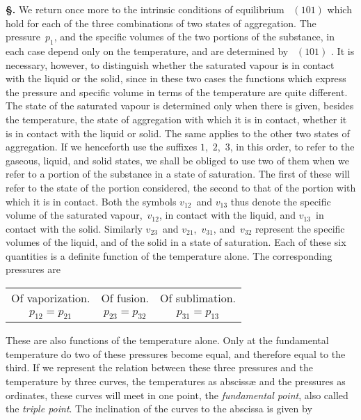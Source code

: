 \documentclass[12pt]{book}[2005/09/16]
\newcommand{\Chg}[2]{#2}
\newcommand{\Add}[1]{\Chg{}{#1}}
\newcommand{\TableFont}{\footnotesize}%
\newcommand{\Section}[1]{
  \medskip\par\textbf{§\;#1}
  \label{section:#1}
}
\newcommand{\Eq}[1]{%
  \hyperref[eqn:#1]{\ensuremath{#1}}%
}
\newcommand{\PageSep}[1]{\ignorespaces}
\begin{document}
\Section{188.} We return once more to the intrinsic conditions
of equilibrium~\Eq{(101)} which hold for each of the three
combinations of two states of aggregation. The pressure~$p_{1}$,
and the specific volumes of the two portions of the
substance, in each case depend only on the temperature,
and are determined by~\Eq{(101)}. It is necessary, however, to
distinguish whether the saturated vapour is in contact
with the liquid or the solid, since in these two cases the
functions which express the pressure and specific volume
in terms of the temperature are quite different. The state
of the saturated vapour is determined only when there is
given, besides the temperature, the state of aggregation
with which it is in contact, whether it is in contact with the
liquid or solid. The same applies to the other two states of
aggregation. If we henceforth use the suffixes $1$,~$2$,~$3$, in
this order, to refer to the gaseous, liquid, and solid states,
we shall be obliged to use two of them when we refer to a
portion of the substance in a state of saturation. The first
of these will refer to the state of the portion considered,
the second to that of the portion with which it is in contact.
Both the symbols $v_{12}$~and $v_{13}$ thus denote the specific
volume of the saturated vapour,~$v_{12}$, in contact with the
liquid, and $v_{13}$~in contact with the solid. Similarly $v_{23}$~and
$v_{21}$,~$v_{31}$\Add{,} and~$v_{32}$ represent the specific volumes of the liquid,
and of the solid in a state of saturation. Each of these
six quantities is a definite function of the temperature
alone. The corresponding pressures are
\begin{center}
\TableFont
\begin{tabular}{ccc}
Of vaporization. & Of fusion. & Of sublimation. \\
$p_{12} = p_{21}$ &
$p_{23} = p_{32}$ &
$p_{31} = p_{13}$ \\
\end{tabular}
\end{center}
These are also functions of the temperature alone. Only
at the fundamental temperature do two of these pressures
become equal, and therefore equal to the third. If we
represent the relation between these three pressures and the
temperature by three curves, the temperatures as abscissæ
and the pressures as ordinates, these curves will meet in one
point, the \emph{fundamental point}, also called the \emph{triple point}.
%
%
%
\PageSep{156}
The inclination of the curves to the abscissa is given by
\end{document}
